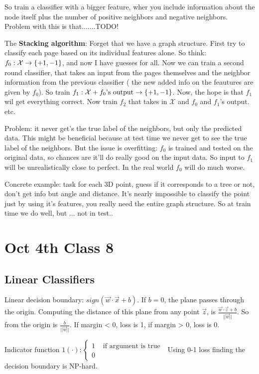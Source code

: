 So train a classifier with a bigger feature, wher you include
information about the node itself plus the number of positive
neighbors and negative neighbors. Problem with this is that.......TODO!

The \textbf{Stacking algorithm}: Forget that we have a graph structure. First try
to classify each page based on its individual features alone. So
think: $f_0:\mathcal{X}\rightarrow \{+1, -1\}$, and now I have guesses for
all.
Now we can train a second round classifier, that takes an input from
the pages themselves and the neighbor information from the previous
classifier ( the new added info on the feautures are given by
$f_0$). So train $f_1:\mathcal{X}+f_0\text{'s output}\rightarrow
\{+1,-1\}$. Now, the hope is that $f_1$ wil get everything correct.
Now train $f_2$ that takes in $\mathcal{X}$ and $f_0$ and $f_1$'s
output. etc.

Problem: it never get's the true label of the neighbors, but only the
predicted data. This might be beneficial because at test time we never get to see
the true label of the neighbors. But the issue is overfitting: $f_0$
is trained and tested on the original data, so chances are it'll do
really good on the input data. So input to $f_1$ will be
unrealistically close to perfect. In the real world $f_0$ will do much
worse.

Concrete example: task for each 3D point, guess if it corresponds to a
tree or not, don't get info but angle and distance. It's nearly
impossible to classify the point just by using it's features, you
really need the entire graph structure. So at train time we do well,
but ... not in test..
\pagebreak
\section{Oct 4th Class 8}
\label{sec:class8}

\subsection{Linear Classifiers}
\label{sec:linear}

Linear decision boundary: $sign(\vec w \cdot \vec x + b)$. If $b=0$,
the plane passes through the origin. Computing the distance of this
plane from any point $\vec z$, is $\frac{\vec w \cdot \vec z +
  b}{||\vec w||}$.
 So from the origin is $\frac{b}{||\vec w||}$. If margin < 0,
loss is 1, if margin > 0, loss is 0.

Indicator function $\mathcal{1}(\cdot):
\begin{cases}
  1 & \text{ if argument is true }\\ 0
\end{cases}
$ Using 0-1 loss finding the decision boundary is NP-hard.

